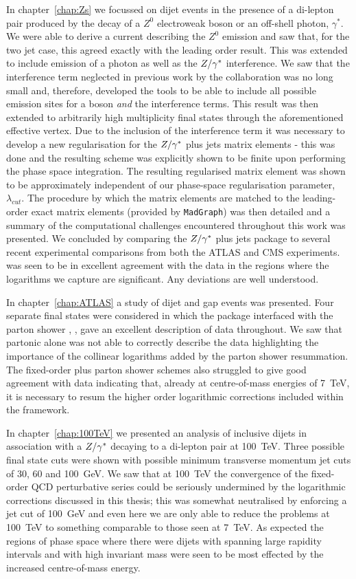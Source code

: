 In chapter~\ref{chap:Zs} we focussed on dijet events in the presence of a di-lepton pair produced by
the decay of a $Z^0$ electroweak boson or an off-shell photon, $\gamma^*$.  We were able to derive a
current describing the $Z^0$ emission and saw that, for the two jet case, this agreed exactly with the
leading order result.  This was extended to include emission of a photon as well as the $Z/\gamma^*$ interference.
We saw that the interference term neglected in previous work by the \hej collaboration was no long small
and, therefore, developed the tools to be able to include all possible emission sites for a boson \emph{and}
the interference terms.  This result was then extended to arbitrarily high multiplicity final states through
the aforementioned effective vertex.  Due to the inclusion of the interference term it was necessary
to develop a new regularisation for the $Z/\gamma^*$ plus jets matrix elements - this was done and the resulting
scheme was explicitly shown to be finite upon performing the phase space integration.  The resulting
regularised matrix element was shown to be approximately independent of our phase-space regularisation
parameter, $\lambda_{cut}$.  The procedure by which the \HEJ matrix elements are matched to the leading-order
exact matrix elements (provided by \texttt{MadGraph}) was then detailed and a summary of the computational
challenges encountered throughout this work was presented.  We concluded by comparing the \HEJ $Z/\gamma^*$ plus jets
package to several recent experimental comparisons from both the ATLAS and CMS experiments.  \HEJ was seen to
be in excellent agreement with the data in the regions where the logarithms we capture are significant.
Any deviations are well understood.

In chapter~\ref{chap:ATLAS} a study of dijet and gap events was presented.  Four separate final states
were considered in which the \HEJ package interfaced with the parton shower \ARIADNE, \HEJA, gave an
excellent description of data throughout.  We saw that partonic \HEJ alone was not able to correctly
describe the data highlighting the importance of the collinear logarithms added by the parton shower
resummation.  The fixed-order plus parton shower schemes also struggled to give good agreement with
data indicating that, already at centre-of-mass energies of 7~TeV, it is necessary to resum the higher
order logarithmic corrections included within the \hej framework.

In chapter~\ref{chap:100TeV} we presented an analysis of inclusive dijets in association with a $Z/\gamma^*$
decaying to a di-lepton pair at 100~TeV.  Three possible final state cuts were shown with possible
minimum transverse momentum jet cuts of 30, 60 and 100~GeV.  We saw that at 100~TeV the
convergence of the fixed-order QCD perturbative series could be seriously undermined by the logarithmic
corrections discussed in this thesis; this was somewhat neutralised by enforcing a jet cut of
100~GeV and even here we are only able to reduce the problems at 100~TeV to something comparable
to those seen at 7~TeV.  As expected the regions of phase space where there were dijets with spanning
large rapidity intervals and with high invariant mass were seen to be most effected by the increased
centre-of-mass energy.

